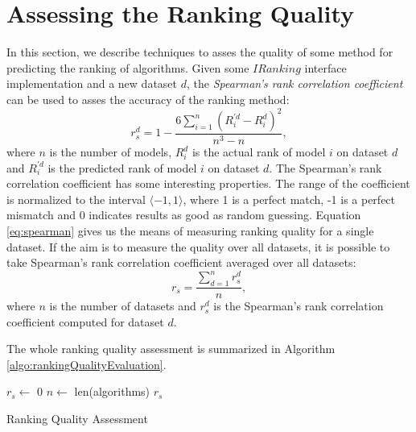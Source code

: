 \section{Assessing the Ranking Quality}
\label{section:rankingQuality}
In this section, we describe techniques to asses the quality of some method for predicting the ranking of algorithms. 
Given some $IRanking$ interface implementation and a new dataset $d$, the \emph{Spearman's rank correlation coefficient} can be used to asses the accuracy of the ranking method:
\begin{equation}
\label{eq:spearman}
r_s^d=1-\frac{6\sum_{i=1}^{n}(R^{'d}_i-R^d_i)^2}{n^3-n},
\end{equation}
where $n$ is the number of models, $R^d_i$ is the actual rank of model $i$ on dataset $d$ and $R^{'d}_i$ is the predicted rank of model $i$ on dataset $d$. The Spearman's rank correlation coefficient has some interesting properties. The range of the coefficient is normalized to the interval $\langle-1,1\rangle$, where 1 is a perfect match, -1 is a perfect mismatch and 0 indicates results as good as random guessing.
Equation \ref{eq:spearman} gives us the means of measuring ranking quality for a single dataset. If the aim is to measure the quality over all datasets, it is possible to take Spearman's rank correlation coefficient averaged over all datasets: 
\begin{equation}
\label{eq:averageSpearman}
r_s=\frac{\sum_{d=1}^{n}r^d_s}{n},
\end{equation}
where $n$ is the number of datasets and $r^d_s$ is the Spearman's rank correlation coefficient computed for dataset $d$.

The whole ranking quality assessment is summarized in Algorithm \ref{algo:rankingQualityEvaluation}.
\IncMargin{1em}
\begin{algorithm}
	\BlankLine
	$r_s\leftarrow$ 0\;
	$n \leftarrow$ len(algorithms)\;
	\Return $r_s$\;
	\caption{Ranking Quality Assessment}\label{algo:rankingQualityEvaluation}
\end{algorithm}\DecMargin{1em}

